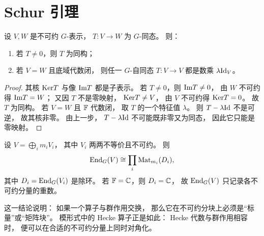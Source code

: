 \section{Schur 引理}
\begin{theorem}[Schur 引理]
设 $V,W$ 是不可约 $G$-表示， $T:V\to W$ 为 $G$-同态。 则：
\begin{enumerate}[label=(\arabic*)]
\item 若 $T\neq 0$，则 $T$ 为同构；
\item 若 $V=W$ 且底域代数闭，
则任一 $G$-自同态 $T:V\to V$ 都是数乘 $\lambda\mathrm{Id}_V$。
\end{enumerate}
\end{theorem}
\begin{proof}
其核 $\mathrm{Ker} T$ 与像 $\mathrm{Im} T$ 都是子表示。 若 $T\neq 0$，则 $\mathrm{Im} T\neq 0$， 由 $W$ 不可约得 $\mathrm{Im} T=W$； 又因 $T$ 不是零映射， $\mathrm{Ker} T\neq V$， 由 $V$ 不可约得 $\mathrm{Ker} T=0$。 故 $T$ 为同构。 若 $V=W$ 且 $\mathbb{F}$ 代数闭， 取 $T$ 的一个特征值 $\lambda$。 则 $T-\lambda\mathrm{Id}$ 不是可逆， 故其核非零。 由上一步， $T-\lambda\mathrm{Id}$ 不可能既非零又为同态， 因此它只能是零映射。
\end{proof}
\begin{corollary}
设 $V=\bigoplus_i m_i V_i$， 其中 $V_i$ 两两不等价且不可约。 则
\[
\mathrm{End}_G(V)\cong \prod_i \mathrm{Mat}_{m_i}(D_i),
\]
其中 $D_i=\mathrm{End}_G(V_i)$ 是除环。 若 $\mathbb{F}=\mathbb{C}$，则 $D_i=\mathbb{C}$， 故 $\mathrm{End}_G(V)$ 只记录各不可约分量的重数。
\end{corollary}
这一结论说明： 如果一个算子与群作用交换， 那么它在不可约分块上必须是“标量”或“矩阵块”。 模形式中的 Hecke 算子正是如此： Hecke 代数与群作用相容时， 便可以在合适的不可约分量上同时对角化。
